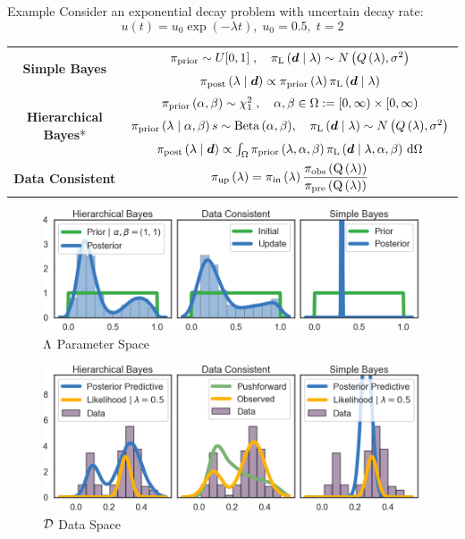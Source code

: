 \begin{block}{Example}
\centering
Consider an exponential decay problem with uncertain decay rate:
\begin{equation*}
       u(t) = u_0\exp(-\lambda t), \; u_0 = 0.5 ,\; t=2
   \end{equation*}

\begin{tabular}{c|c}
\toprule
\multirow{2}{*}{\textbf{Simple Bayes}} & 
$\prior \sim U[0,1]\; , \quad  \likelihood\qGivelam\sim N\left(Q\lam,\sigma^2\right) $ \\
                                        & $\bayes$ \\ 
\midrule
\multirow{3}{*}{\textbf{Hierarchical Bayes}{*}}   &
        $\prior\hyper \sim \chi^2_1\; , \quad \alpha,\beta\in\Omega :=[0,\infty)\times[0,\infty)$ \\
        & $\prior\lamGiveH s\sim \text{Beta}\hyper, \quad \likelihood\qGivelam \sim N\left(Q\lam,\sigma^2\right)$ \\
        & $\Hbayes$ \\
\midrule
\textbf{Data Consistent} &  $\dci$\\
\bottomrule
\end{tabular}
\vspace{1cm}
\begin{figure}
        \includegraphics[width=32cm]{figures/distr_EX_lambda_space.png}
        \vspace{-0.5cm}
        \centering
        \caption{\large $\pspace$ Parameter Space }
\end{figure}
\vspace{-0.5cm}
\begin{figure}
        \includegraphics[width=32cm]{figures/distr_EX_data_space.png}
        \vspace{-0.5cm}
        \centering
        \caption{\large $\dspace$ Data Space  }
\end{figure}



\end{block}
